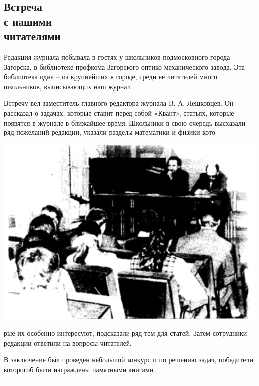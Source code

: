 \documentclass[main.tex]{subfiles}
\begin{document}
\begin{multicols}{2}

    \section*{Встреча \\ с нашими \\ читателями}

    Редакция журнала побывала в гостях у школьников подмосковного города Загорска, в библиотеке профкома Загорского оптико-механического завода. Эта библиотека одна -- из крупнейших в городе, среди ее читателей много школьников, выписывающих наш журнал.

    Встречу вел заместитель главного редактора журнала B. А. Лешковцев. Он рассказал о задачах, которые ставит перед собой «Квант», статьях, которые появятся в журнале в ближайшее время. Школьники в свою очередь высхазали ряд пожеланий редакции, указали разделы математики и физики кото-


    \columnbreak  
    
    \includegraphics[height=\textheight, width=\linewidth, keepaspectratio]{images/photo.png}

        \begin{multicols}{2}

        \noindent рые их особенно интересуют, подсказали ряд тем для статей. Затем сотрудники редакции ответили на вопросы читателей.
        \columnbreak

        В заключение был проведен небольшой конкурс п по решению задач, победители которогоб были награждены памятными книгами.

        \end{multicols}

\end{multicols}

\hrule
\end{document}
